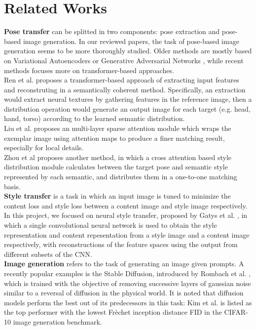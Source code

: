 \documentclass{article}
\begin{document}
\section{Related Works}
\textbf{Pose transfer} can be splitted in two components: pose extraction and pose-based image generation. In our reviewed papers, the task of pose-based image generation seems to be more thoroughly studied. Older methods are mostly based on Variational Autoencoders or Generative Adversarial Networks \cite{DBLP:journals/corr/abs-1801-00055}, while recent methods focuses more on transformer-based approaches.\\
Ren et al. \cite{ren2022neural} proposes a transformer-based approach of extracting input features and reconstruting in a semantically coherent method. Specifically, an extraction would extract neural textures by gathering features in the reference image, then a distribution operation would generate an output image for each target (e.g. head, hand, torso) according to the learned semantic distribution.\\
Liu et al. \cite{liu2022dynast} proposes an multi-layer sparse attention module which wraps the exemplar image using attention maps to produce a finer matching result, especially for local details.\\
Zhou et al \cite{zhou2022cross} proposes another method, in which a cross attention based style distribution module calculates between the target pose and semantic style represented by each semantic, and distributes them in a one-to-one matching basis.\\
\textbf{Style transfer} is a task in which an input image is tuned to minimize the content loss and style loss between a content image and style image respectively.\\
In this project, we focused on neural style transfer, proposed by Gatys et al. \cite{gatys2015neural}, in which a single convolutional neural network is used to obtain the style representation and content repesentation from a style image and a content image respectively, with reconstructions of the feature spaces using the output from different subsets of the CNN.\\
\textbf{Image generation} refers to the task of generating an image given prompts. A recently popular examples is the Stable Diffusion, introduced by Rombach et al. \cite{stable-diffusion}, which is trained with the objective of removing successive layers of gaussian noise similar to a reversal of diffusion in the physical world. It is noted that diffusion models perform the best out of its predecessors in this task: Kim et al. \cite{kim2023refining} is listed as the top performer with the lowest Fr{\`{e}}chet inception distance FID in the CIFAR-10 image generation benchmark.
\end{document}
